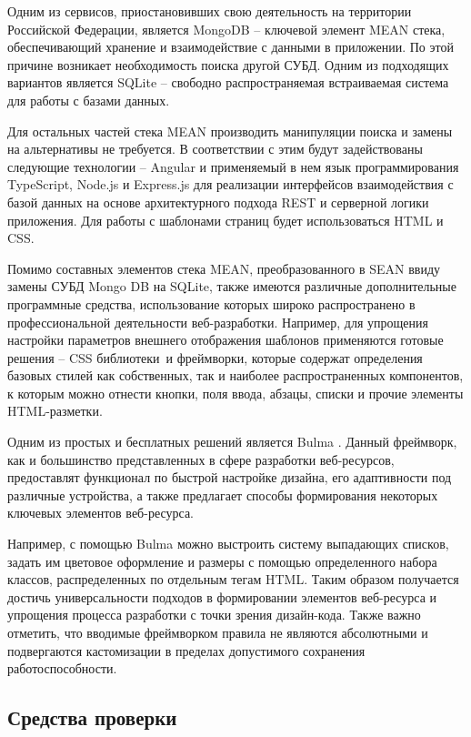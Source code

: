 Одним из сервисов, приостановивших свою деятельность на территории Российской Федерации, является MongoDB -- ключевой элемент MEAN стека, обеспечивающий хранение и взаимодействие с данными в приложении.
По этой причине возникает необходимость поиска другой СУБД.
Одним из подходящих вариантов является SQLite -- свободно распространяемая встраиваемая система для работы с базами данных.

Для остальных частей стека MEAN производить манипуляции поиска и замены на альтернативы не требуется.
В соответствии с этим будут задействованы следующие технологии -- Angular и применяемый в нем язык программирования TypeScript, Node.js и Express.js для реализации интерфейсов взаимодействия с базой данных на основе архитектурного подхода REST и серверной логики приложения.
Для работы с шаблонами страниц будет использоваться HTML и CSS.

Помимо составных элементов стека MEAN, преобразованного в SEAN ввиду замены СУБД Mongo DB на SQLite, также имеются различные дополнительные программные средства, использование которых широко распространено в профессиональной деятельности веб-разработки.
Например, для упрощения настройки параметров внешнего отображения шаблонов применяются готовые решения -- CSS библиотеки и фреймворки, которые содержат определения базовых стилей как собственных, так и наиболее распространенных компонентов, к которым можно отнести кнопки, поля ввода, абзацы, списки и прочие элементы HTML-разметки.

Одним из простых и бесплатных решений является Bulma \cite{bulma}.
Данный фреймворк, как и большинство представленных в сфере разработки веб-ресурсов, предоставлят функционал по быстрой настройке дизайна, его адаптивности под различные устройства, а также предлагает способы формирования некоторых ключевых элементов веб-ресурса.

Например, с помощью Bulma можно выстроить систему выпадающих списков, задать им цветовое оформление и размеры с помощью определенного набора классов, распределенных по отдельным тегам HTML.
Таким образом получается достичь универсальности подходов в формировании элементов веб-ресурса и упрощения процесса разработки с точки зрения дизайн-кода.
Также важно отметить, что вводимые фреймворком правила не являются абсолютными и подвергаются кастомизации в пределах допустимого сохранения работоспособности.

\subsection{Средства проверки}\label{средства-проверки}

